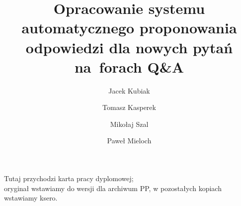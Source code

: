 \documentclass[polish,bachelor,a4paper,oneside]{ppfcmthesis}
\author{%
   Jacek Kubiak \album{116307} \and 
   Tomasz Kasperek \album{116393} \and
   Mikołaj Szal \album{117068} \and 
   Paweł Mieloch \album{117077}}
\title{Opracowanie systemu automatycznego proponowania odpowiedzi dla nowych pytań na~forach Q\&A} %
\begin{document}
\frontmatter\pagestyle{empty}%
\maketitle\cleardoublepage%

\thispagestyle{empty}\vspace*{\fill}%
\begin{center}Tutaj przychodzi karta pracy dyplomowej;\\oryginał wstawiamy do wersji dla archiwum PP, w pozostałych kopiach wstawiamy ksero.\end{center}%
\vfill\cleardoublepage%

\pagestyle{ppfcmthesis}%
\tableofcontents* \cleardoublepage%

\mainmatter











{\raggedright\sloppy\small}

\ppcolophon
\end{document}
